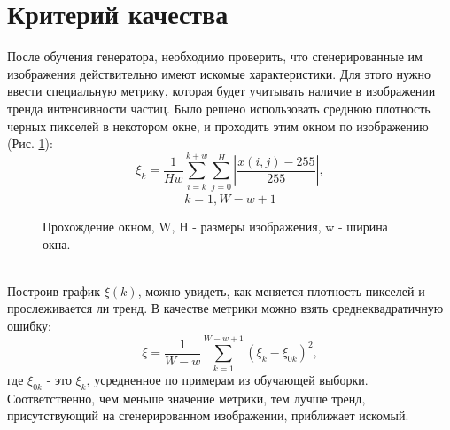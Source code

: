 \documentclass[a4paper]{article}
\begin{document}
	\section{Критерий качества}
		После обучения генератора, необходимо проверить, что сгенерированные им изображения действительно имеют искомые характеристики. Для этого нужно ввести специальную метрику, которая будет учитывать наличие в изображении тренда интенсивности частиц. Было решено использовать среднюю плотность черных пикселей в некотором окне, и проходить этим окном по изображению (Рис. \ref{window}):
		\newpage
		$$\xi_k = \frac{1}{H w}{\sum_{i=k}^{k+w} \sum_{j=0}^{H}\left| \frac{x(i, j) - 255}{255} \right|}, $$$$k = \overline{1, W - w + 1} $$
		\begin{figure}
			\caption{Прохождение окном, W, H - размеры изображения, w - ширина окна.}
			\label{window}
		\end{figure}
		\\
		Построив график $\xi(k)$, можно увидеть, как меняется плотность пикселей и прослеживается ли тренд. В качестве метрики можно взять среднеквадратичную ошибку:
		$$ \xi = \frac{1}{W-w}\sum_{k=1}^{W-w+1} (\xi_k - \xi_{0k})^2,$$
		где $\xi_{0k}$ - это $\xi_k$, усредненное по примерам из обучающей выборки. Соответственно, чем меньше значение метрики, тем лучше тренд, присутствующий на сгенерированном изображении, приближает искомый.
\end{document}
